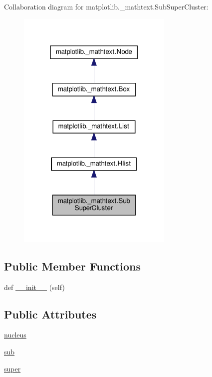 Collaboration diagram for matplotlib.\+\_\+mathtext.\+Sub\+Super\+Cluster\+:
\nopagebreak
\begin{figure}[H]
\begin{center}
\leavevmode
\includegraphics[width=211pt]{classmatplotlib_1_1__mathtext_1_1SubSuperCluster__coll__graph}
\end{center}
\end{figure}
\subsection*{Public Member Functions}
\begin{DoxyCompactItemize}
\item 
def \hyperlink{classmatplotlib_1_1__mathtext_1_1SubSuperCluster_a2b6f38fcb25502a8dfe6292b3d42ac65}{\+\_\+\+\_\+init\+\_\+\+\_\+} (self)
\end{DoxyCompactItemize}
\subsection*{Public Attributes}
\begin{DoxyCompactItemize}
\item 
\hyperlink{classmatplotlib_1_1__mathtext_1_1SubSuperCluster_a3df0c434b5aefd36ee37e8ce18899fd4}{nucleus}
\item 
\hyperlink{classmatplotlib_1_1__mathtext_1_1SubSuperCluster_aa0ecd6a1022f635fa64c004844b42566}{sub}
\item 
\hyperlink{classmatplotlib_1_1__mathtext_1_1SubSuperCluster_a79528178c5d3c30cef31359f500bf12b}{super}
\end{DoxyCompactItemize}


